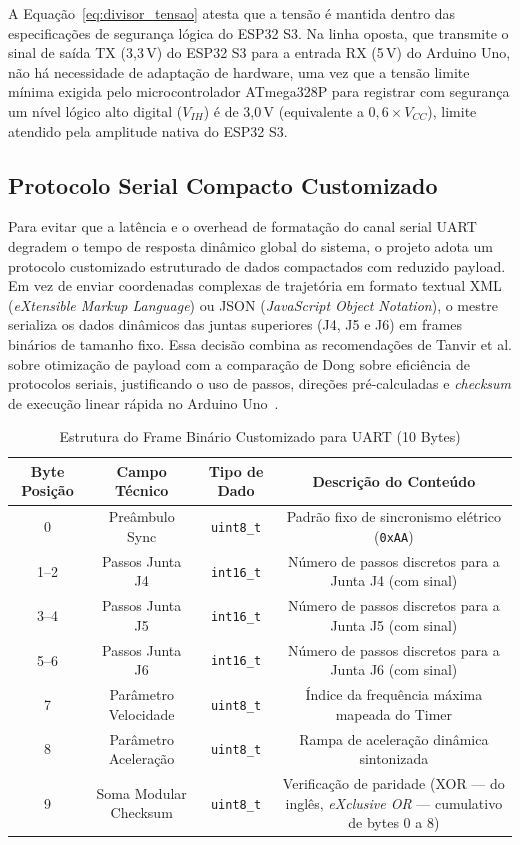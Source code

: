 A Equação~\ref{eq:divisor_tensao} atesta que a tensão é mantida dentro das especificações de segurança lógica do ESP32 S3. Na linha oposta, que transmite o sinal de saída TX (3{,}3\,V) do ESP32 S3 para a entrada RX (5\,V) do Arduino Uno, não há necessidade de adaptação de hardware, uma vez que a tensão limite mínima exigida pelo microcontrolador ATmega328P para registrar com segurança um nível lógico alto digital ($V_{IH}$) é de 3{,}0\,V (equivalente a $0{,}6 \times V_{CC}$), limite atendido pela amplitude nativa do ESP32 S3.

\subsection{Protocolo Serial Compacto Customizado}
\label{subsec:protocolo_customizado}

Para evitar que a latência e o overhead de formatação do canal serial UART degradem o tempo de resposta dinâmico global do sistema, o projeto adota um protocolo customizado estruturado de dados compactados com reduzido payload. Em vez de enviar coordenadas complexas de trajetória em formato textual XML (\textit{eXtensible Markup Language}) ou JSON (\textit{JavaScript Object Notation}), o mestre serializa os dados dinâmicos das juntas superiores (J4, J5 e J6) em frames binários de tamanho fixo. Essa decisão combina as recomendações de Tanvir et al. sobre otimização de payload com a comparação de Dong sobre eficiência de protocolos seriais, justificando o uso de passos, direções pré-calculadas e \textit{checksum} de execução linear rápida no Arduino Uno~\cite{tanvir2024optimizing, dong2022comparative}.

\begin{table}[h!]
\centering
\caption{Estrutura do Frame Binário Customizado para UART (10 Bytes)}
\label{tab:frame_serial}
\begin{tabular}{|c|c|c|c|}
\hline
\textbf{Byte Posição} & \textbf{Campo Técnico} & \textbf{Tipo de Dado} & \textbf{Descrição do Conteúdo} \\ \hline
0 & Preâmbulo Sync & \texttt{uint8\_t} & Padrão fixo de sincronismo elétrico (\texttt{0xAA}) \\ \hline
1--2 & Passos Junta J4 & \texttt{int16\_t} & Número de passos discretos para a Junta J4 (com sinal) \\ \hline
3--4 & Passos Junta J5 & \texttt{int16\_t} & Número de passos discretos para a Junta J5 (com sinal) \\ \hline
5--6 & Passos Junta J6 & \texttt{int16\_t} & Número de passos discretos para a Junta J6 (com sinal) \\ \hline
7 & Parâmetro Velocidade & \texttt{uint8\_t} & Índice da frequência máxima mapeada do Timer \\ \hline
8 & Parâmetro Aceleração & \texttt{uint8\_t} & Rampa de aceleração dinâmica sintonizada \\ \hline
9 & Soma Modular Checksum & \texttt{uint8\_t} & Verificação de paridade (XOR --- do inglês, \textit{eXclusive OR} --- cumulativo de bytes 0 a 8) \\ \hline
\end{tabular}
\end{table}

